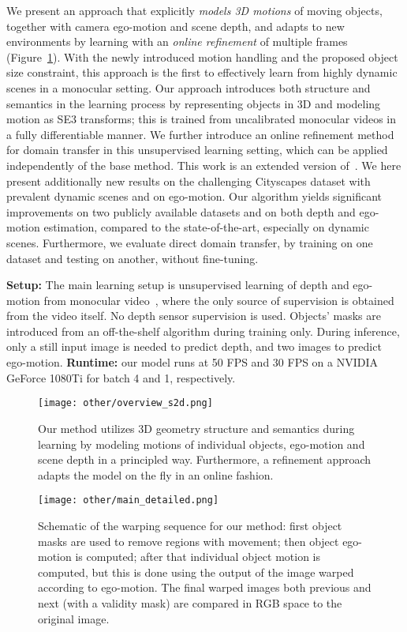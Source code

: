\documentclass[10pt,twocolumn,letterpaper]{article}
\begin{document}
We present an approach that explicitly {\it models 3D motions} of moving objects, together with camera ego-motion and scene depth, and adapts to new environments by learning with an {\it online refinement} of multiple frames (Figure~\ref{fig:approach}).
With the newly introduced motion handling and the proposed object size constraint, this approach is the first to effectively learn from highly dynamic scenes in a monocular setting. Our approach introduces both structure and semantics in the learning process by representing objects in 3D and modeling motion as SE3 transforms; this is trained from uncalibrated monocular videos in a fully differentiable manner. 
We further introduce an online refinement method for domain transfer in this unsupervised learning setting, which can be applied independently of the base method.
This work is an extended version of~\cite{casser2019depth}. We here present additionally new results on the challenging Cityscapes dataset with prevalent dynamic scenes and on ego-motion.
Our algorithm yields significant improvements on two publicly available datasets and on both depth and ego-motion estimation, compared to the state-of-the-art, especially on dynamic scenes.
Furthermore, we evaluate direct domain transfer, by training on one dataset and testing on another, without fine-tuning.

\textbf{Setup:}
The main learning setup is unsupervised learning of depth and ego-motion from monocular video~\cite{zhou2017unsupervised}, where the only source of supervision is obtained from the video itself. No depth sensor supervision is used. Objects' masks are introduced from an off-the-shelf algorithm during training only. During inference, only a still input image is needed to predict depth, and two images to predict ego-motion. \textbf{Runtime:} our model runs at 50 FPS and 30 FPS on a NVIDIA GeForce 1080Ti for batch 4 and 1, respectively.

\begin{figure}[t]
    \centering        
    \texttt{[image: other/overview\_s2d.png]}
    \caption{Our method utilizes 3D geometry structure and semantics during learning by modeling motions of individual objects, ego-motion and scene depth in a principled way. Furthermore, a refinement approach adapts the model on the fly in an online fashion.}
    \label{fig:approach}
\end{figure}

\begin{figure*}[t]
    \begin{center}
    \texttt{[image: other/main\_detailed.png]}
    \end{center}
    \caption{Schematic of the warping sequence for our method: first object masks are used to remove regions with movement; then object ego-motion is computed; after that individual object motion is computed, but this is done using the output of the image warped according to ego-motion. The final warped images both previous and next (with a validity mask) are compared in RGB space to the original image.}
    \label{fig:approach_detailed}
\end{figure*}
\end{document}
